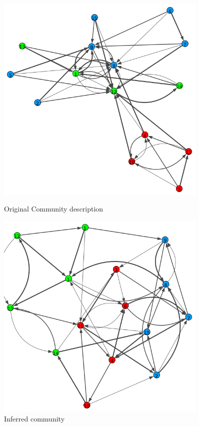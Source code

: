 \documentclass[12pt]{ociamthesis}  %
\begin{document}
	\begin{figure}[H]
		\centering
		\begin{minipage}{0.45\textwidth}
			\centering
			\includegraphics[width=0.9\textwidth]{OriginalPlot} %
			\caption{Original Community description}
			\label{label-image2}
		\end{minipage}\hfill
		\begin{minipage}{0.45\textwidth}
			\centering
			\includegraphics[width=0.9\textwidth]{OptimizationPlot} %
			\caption{Inferred community}
			\label{label-image3}
		\end{minipage}
	\end{figure}
	
\end{document}
